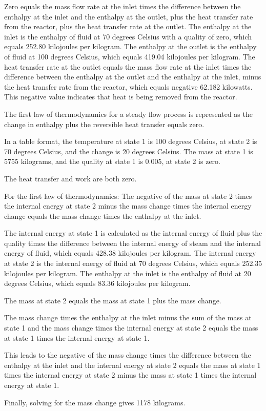 Zero equals the mass flow rate at the inlet times the difference between the enthalpy at the inlet and the enthalpy at the outlet, plus the heat transfer rate from the reactor, plus the heat transfer rate at the outlet. The enthalpy at the inlet is the enthalpy of fluid at 70 degrees Celsius with a quality of zero, which equals 252.80 kilojoules per kilogram. The enthalpy at the outlet is the enthalpy of fluid at 100 degrees Celsius, which equals 419.04 kilojoules per kilogram. The heat transfer rate at the outlet equals the mass flow rate at the inlet times the difference between the enthalpy at the outlet and the enthalpy at the inlet, minus the heat transfer rate from the reactor, which equals negative 62.182 kilowatts. This negative value indicates that heat is being removed from the reactor.

The first law of thermodynamics for a steady flow process is represented as the change in enthalpy plus the reversible heat transfer equals zero.

In a table format, the temperature at state 1 is 100 degrees Celsius, at state 2 is 70 degrees Celsius, and the change is 20 degrees Celsius. The mass at state 1 is 5755 kilograms, and the quality at state 1 is 0.005, at state 2 is zero.

The heat transfer and work are both zero.

For the first law of thermodynamics:
The negative of the mass at state 2 times the internal energy at state 2 minus the mass change times the internal energy change equals the mass change times the enthalpy at the inlet.

The internal energy at state 1 is calculated as the internal energy of fluid plus the quality times the difference between the internal energy of steam and the internal energy of fluid, which equals 428.38 kilojoules per kilogram. The internal energy at state 2 is the internal energy of fluid at 70 degrees Celsius, which equals 252.35 kilojoules per kilogram. The enthalpy at the inlet is the enthalpy of fluid at 20 degrees Celsius, which equals 83.36 kilojoules per kilogram.

The mass at state 2 equals the mass at state 1 plus the mass change.

The mass change times the enthalpy at the inlet minus the sum of the mass at state 1 and the mass change times the internal energy at state 2 equals the mass at state 1 times the internal energy at state 1.

This leads to the negative of the mass change times the difference between the enthalpy at the inlet and the internal energy at state 2 equals the mass at state 1 times the internal energy at state 2 minus the mass at state 1 times the internal energy at state 1.

Finally, solving for the mass change gives 1178 kilograms.